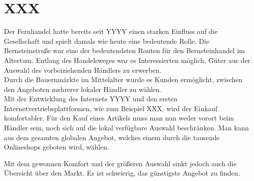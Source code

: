 \usepackage{comment}

\section{XXX}

\begin{comment}
    https://de.wikipedia.org/wiki/Bernsteinstra%
    https://de.statista.com/statistik/studie/id/23510/dokument/e-commerce-in-europa-statista-dossier/
\end{comment}

Der Fernhandel hatte bereits seit YYYY einen starken Einfluss auf die Gesellschaft und spielt damals wie heute
eine bedeutende Rolle.
Die Bernsteinstraße war eine der bedeutendsten Routen für den Bernsteinhandel im Altertum.
Entlang des Handelsweges war es Interessierten möglich, Güter aus der Auswahl des vorbeiziehenden Händlers zu
erwerben.\\
Durch die Bauernmärkte im Mittelalter wurde es Kunden ermöglicht, zwischen den Angeboten mehrerer lokaler Händler zu
wählen.\\
Mit der Entwicklung des Internets YYYY und den ersten Internetvertriebsplattformen, wie zum Beispiel XXX, wird der
Einkauf komfortabler.
Für den Kauf eines Artikels muss man nun weder vorort beim Händler sein, noch sich auf die lokal verfügbare Auswahl
beschränken.
Man kann aus dem gesamten globalen Angebot, welches einem durch die tausende Onlineshops geboten wird, wählen.

Mit dem gewonnen Komfort und der größeren Auswahl sinkt jedoch auch die Übersicht über den Markt.
Es ist schwierig, das günstigste Angebot zu finden.